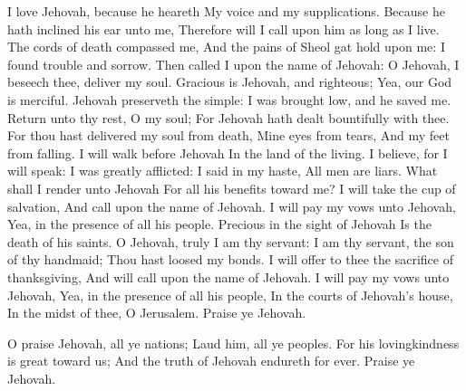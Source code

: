 I love Jehovah, because he heareth My voice and my supplications.  Because he hath inclined his ear unto me, Therefore will I call upon him as long as I live.  The cords of death compassed me, And the pains of Sheol gat hold upon me: I found trouble and sorrow.  Then called I upon the name of Jehovah: O Jehovah, I beseech thee, deliver my soul.  Gracious is Jehovah, and righteous; Yea, our God is merciful.  Jehovah preserveth the simple: I was brought low, and he saved me.  Return unto thy rest, O my soul; For Jehovah hath dealt bountifully with thee.  For thou hast delivered my soul from death, Mine eyes from tears, And my feet from falling.  I will walk before Jehovah In the land of the living.  I believe, for I will speak: I was greatly afflicted:  I said in my haste, All men are liars.  What shall I render unto Jehovah For all his benefits toward me?  I will take the cup of salvation, And call upon the name of Jehovah.  I will pay my vows unto Jehovah, Yea, in the presence of all his people.  Precious in the sight of Jehovah Is the death of his saints.  O Jehovah, truly I am thy servant: I am thy servant, the son of thy handmaid; Thou hast loosed my bonds.  I will offer to thee the sacrifice of thanksgiving, And will call upon the name of Jehovah.  I will pay my vows unto Jehovah, Yea, in the presence of all his people,  In the courts of Jehovah’s house, In the midst of thee, O Jerusalem. Praise ye Jehovah. 

O praise Jehovah, all ye nations; Laud him, all ye peoples.  For his lovingkindness is great toward us; And the truth of Jehovah endureth for ever. Praise ye Jehovah. 


